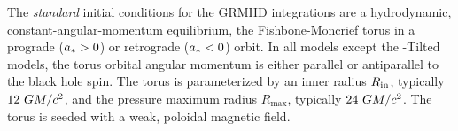 The \emph{standard} initial conditions for the GRMHD integrations are a hydrodynamic, constant-angular-momentum equilibrium, the Fishbone-Moncrief torus \citep{1976ApJ...207..962F}
in a prograde ($a_* > 0$) or retrograde ($a_* < 0$) orbit.
In all models except the \hamr-Tilted models, the torus orbital angular momentum is either parallel or antiparallel to the black hole spin. The torus is parameterized by an inner radius $R_{\rm in}$, typically $12~GM/c^2$, and the pressure maximum radius $R_\mathrm{max}$, typically $24~GM/c^2$.
The torus is seeded with a weak, poloidal magnetic field.

